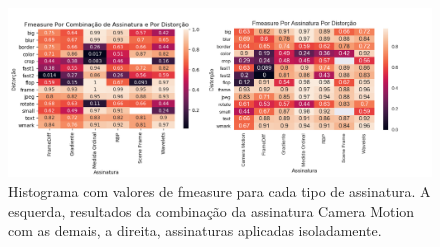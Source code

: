 \begin{figure}
	\caption{Histograma com valores de fmeasure para cada tipo de assinatura. A esquerda, resultados da combinação da assinatura Camera Motion com as demais, a direita, assinaturas aplicadas isoladamente.}
	\label{fig:compacao-metodos}
	\includegraphics[width=\textwidth]{dados/figuras/experimentos/heatmap_final_comparacao.png}	
\end{figure}






